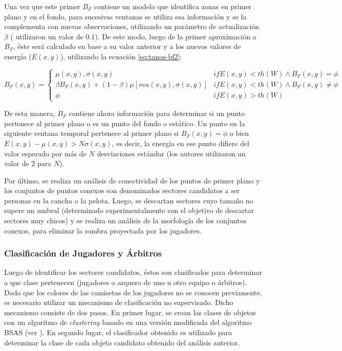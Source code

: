 Una vez que este primer $B_F$ contiene un modelo que identifica zonas en primer
plano y en el fondo, para sucesivas ventanas se utiliza esa información y se la
complementa con nuevas observaciones, utilizando un parámetro de actualización
$\beta$ (\citeauthor*{papers-tanos} utilizaron un valor de $0.1$). De este
modo, luego de la primer aproximación a $B_F$, éste será calculado en base a su
valor anterior y a los nuevos valores de energía ($E(x, y)$), utilizando la
ecuación \ref{eq:tanos-bf2}:

\begin{equation} \label{eq:tanos-bf2}
  B_F(x, y) = \begin{cases}
    \mu(x, y), \sigma(x, y) & if E(x, y) < th(W) \wedge B_F(x, y) = \phi \\
    \beta B_F(x, y) + (1-\beta) \mu\left[mu(x, y), \sigma(x, y)\right] & if E(x, y) < th(W) \wedge B_F(x, y) \neq \phi \\
    \phi & if E(x, y) > th(W)
  \end{cases}
\end{equation}

De esta manera, $B_F$ contiene ahora información para determinar si un punto
pertenece al primer plano o es un punto del fondo o estático. Un punto en la
siguiente ventana temporal pertenece al primer plano si $B_F(x, y) = \phi$ o
bien $E(x, y) - \mu(x, y) > N \sigma(x, y)$, es decir, la energía en ese punto
difiere del valor esperado por más de $N$ desviaciones estándar (los autores
utilizaron un valor de 2 para $N$).

Por último, se realiza un análisis de conectividad de los puntos de primer
plano y los conjuntos de puntos conexos son denominados sectores candidatos
a ser personas en la cancha o la pelota. Luego, se descartan sectores
cuyo tamaño no supere un umbral (determinado experimentalmente con el
objetivo de descartar sectores muy chicos) y se realiza un análisis de la
morfología de los conjuntos conexos, para eliminar la sombra proyectada por los
jugadores.

\subsubsection{Clasificación de Jugadores y Árbitros}

Luego de identificar los sectores candidatos, éstos son clasificados para
determinar a que clase pertenecen (jugadores o arquero de uno u otro equipo
o árbitros). Dado que los colores de las camisetas de
los jugadores no se conocen previamente, es necesario utilizar un mecanismo
de clasificación no supervisado. Dicho mecanismo consiste de dos pasos. En
primer lugar, se crean las clases de objetos con un algoritmo de
\textit{clustering} basado en una versión modificada del algoritmo BSAS
(ver \cite{BSAS}). En segundo lugar, el clasificador obtenido es utilizado
para determinar la clase de cada objeto candidato obtenido del análisis anterior.

